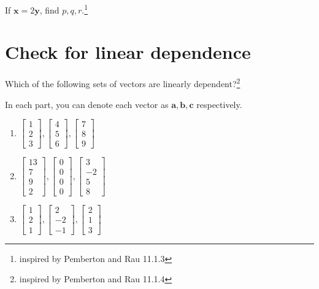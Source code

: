 \documentclass[
]{article}
\begin{document}
If \(\mathbf{x} = 2 \mathbf{y}\), find \(p, q, r\).\footnote{inspired by
  Pemberton and Rau 11.1.3}

\section{Check for linear dependence}\label{check-for-linear-dependence}

Which of the following sets of vectors are linearly
dependent?\footnote{inspired by Pemberton and Rau 11.1.4}

In each part, you can denote each vector as
\(\mathbf{a}, \mathbf{b}, \mathbf{c}\) respectively.

\begin{enumerate}
\def\labelenumi{\alph{enumi}.}
\item
  \(\begin{bmatrix} 1 \\ 2 \\ 3 \end{bmatrix}, \begin{bmatrix} 4 \\ 5 \\ 6 \end{bmatrix}, \begin{bmatrix} 7 \\ 8 \\ 9 \end{bmatrix}\)
\item
  \(\begin{bmatrix} 13 \\ 7 \\ 9 \\ 2 \end{bmatrix}, \begin{bmatrix} 0 \\ 0 \\ 0 \\ 0 \end{bmatrix}, \begin{bmatrix} 3 \\ -2 \\ 5 \\ 8 \end{bmatrix}\)
\item
  \(\begin{bmatrix} 1 \\ 2 \\ 1 \end{bmatrix}, \begin{bmatrix} 2 \\ -2 \\ -1 \end{bmatrix}, \begin{bmatrix} 2 \\ 1 \\ 3 \end{bmatrix}\)
\end{enumerate}
\end{document}
